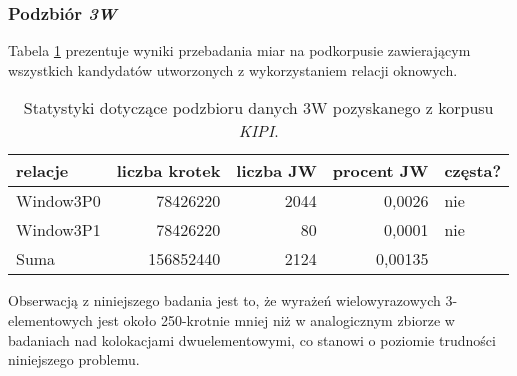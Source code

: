 \subsubsection{Podzbiór \protect\textit{3W}}
Tabela \ref{KIPI_3W_stats} prezentuje wyniki przebadania miar na podkorpusie zawierającym wszystkich kandydatów utworzonych z wykorzystaniem relacji oknowych.

\begin{table}[h!]
\centering
\begin{tabular}{ l | r | r | r | l }
	\toprule
	relacje 	& liczba krotek & liczba JW & procent JW & częsta? 	\\
	\midrule
	Window3P0	&	78426220	&	2044	&	0,0026	&	nie	\\
	Window3P1	&	78426220	&	80	&	0,0001 &	nie	\\
	\midrule									
	Suma		&	156852440	&	2124	&	0,00135	&		\\
	\bottomrule
\end{tabular}
\caption[Statystyki podzbioru danych \emph{KIPI} 3W]{Statystyki dotyczące podzbioru danych 3W pozyskanego z korpusu \emph{KIPI}.}
\label{KIPI_3W_stats}
\end{table}

Obserwacją z niniejszego badania jest to, że wyrażeń wielowyrazowych 3-elementowych jest około 250-krotnie mniej niż w analogicznym zbiorze w badaniach nad kolokacjami dwuelementowymi, co stanowi o poziomie trudności niniejszego problemu.


